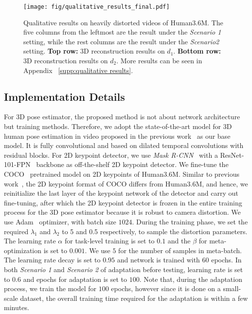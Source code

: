     \begin{figure*}[t]
        \begin{center}
            \texttt{[image: fig/qualitative\_results\_final.pdf]}
        \end{center}
        \vspace{-3mm}
        \caption{Qualitative results on heavily distorted videos of Human3.6M. The five columns from the leftmost are the result under the \small\textit{Scenario 1} \normalsize setting, while the rest columns are the result under the \small\textit{Scenario2} \normalsize setting. \textbf{Top row:} 3D reconstruction results on $d_1$. \textbf{Bottom row:} 3D reconstruction results on $d_2$. More results can be seen in Appendix ~\ref{supp:qualitative results}.}
        \vspace{-1mm}
        \label{fig:qualitative}
        \vspace{-3mm}
    \end{figure*}

    \subsection{Implementation Details}
        \label{sec:implementation details}
        \vspace{-1mm}
        For 3D pose estimator, the proposed method is not about network architecture but training methods. Therefore, we adopt the state-of-the-art model for 3D human pose estimation in video proposed in the previous work~\cite{ref9_pavllo20193d} as our base model. It is fully convolutional and based on dilated temporal convolutions with residual blocks. For 2D keypoint detector, we use \textit{Mask R-CNN}~\cite{ref14_He_2017_ICCV} with a ResNet-101-FPN~\cite{ref35_FPN} backbone as off-the-shelf 2D keypoint detector. We fine-tune the COCO~\cite{ref34_mscoco} pretrained model on 2D keypoints of Human3.6M. Similar to previous work~\cite{ref9_pavllo20193d}, the 2D keypoint format of COCO differs from Human3.6M, and hence, we reinitialize the last layer of the keypoint network of the detector and carry out fine-tuning, after which the 2D keypoint detector is frozen in the entire training process for the 3D pose estimator because it is robust to camera distortion. We use Adam~\cite{ref36_Adam} optimizer, with batch size $1024$. During the training phase, we set the required $\lambda_1$ and $\lambda_2$ to 5 and 0.5 respectively, to sample the distortion parameters. The learning rate $\alpha$ for task-level training is set to $0.1$ and the $\beta$ for meta-optimization is set to $0.001$. We use $5$ for the number of samples in meta-batch. The learning rate decay is set to $0.95$ and network is trained with $60$ epochs. In both \textit{Scenario 1} and \textit{Scenario 2} of adaptation before testing, learning rate is set to $0.6$ and epochs for adaptation is set to $100$. Note that, during the adaptation process, we train the model for $100$ epochs, however since it is done on a small-scale dataset, the overall training time required for the adaptation is within a few minutes.
    
